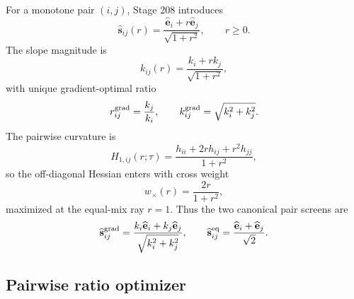 For a monotone pair \((i,j)\), Stage 208 introduces
\begin{equation}
\label{eq:app-part06-pairwise-cone}
\widehat{\mathbf s}_{ij}(r)=
\frac{\widehat{\mathbf e}_i+r\widehat{\mathbf e}_j}{\sqrt{1+r^2}},
\qquad
r\ge0.
\end{equation}
The slope magnitude is
\begin{equation}
\label{eq:app-part06-pairwise-slope}
k_{ij}(r)=\frac{k_i+rk_j}{\sqrt{1+r^2}},
\end{equation}
with unique gradient-optimal ratio
\begin{equation}
\label{eq:app-part06-pairwise-gradient-ratio}
r_{ij}^{\rm grad}=\frac{k_j}{k_i},
\qquad
k_{ij}^{\rm grad}=\sqrt{k_i^2+k_j^2}.
\end{equation}
The pairwise curvature is
\begin{equation}
\label{eq:app-part06-pairwise-curvature}
H_{1,ij}(r;\tau)
=
\frac{h_{ii}+2rh_{ij}+r^2h_{jj}}{1+r^2},
\end{equation}
so the off-diagonal Hessian enters with cross weight
\begin{equation}
\label{eq:app-part06-pairwise-cross-weight}
w_\times(r)=\frac{2r}{1+r^2},
\end{equation}
maximized at the equal-mix ray \(r=1\).  Thus the two canonical pair screens are
\begin{equation}
\label{eq:app-part06-pairwise-canonical-screens}
\widehat{\mathbf s}_{ij}^{\rm grad}
=\frac{k_i\widehat{\mathbf e}_i+k_j\widehat{\mathbf e}_j}{\sqrt{k_i^2+k_j^2}},
\qquad
\widehat{\mathbf s}_{ij}^{\rm eq}
=\frac{\widehat{\mathbf e}_i+\widehat{\mathbf e}_j}{\sqrt2}.
\end{equation}

\subsection{Pairwise ratio optimizer}
\label{subsec:app-part06-pairwise-ratio-optimizer}


